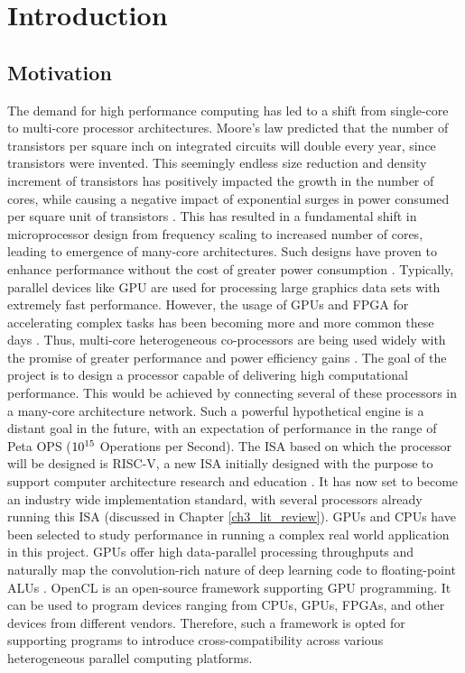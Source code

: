 \chapter{Introduction}
\label{ch1_introduction}
\section{Motivation}
\label{sect1_1}

The demand for high performance computing has led to a shift from single-core to multi-core processor architectures. Moore's law predicted that the number of transistors per square inch on integrated circuits will double every year, since transistors were invented. This seemingly endless size reduction and density increment of transistors has positively impacted the growth in the number of cores, while causing a negative impact of exponential surges in power consumed per square unit of transistors \cite{mimerschedval2015}. This has resulted in a fundamental shift in microprocessor design from frequency scaling to increased number of cores, leading to emergence of many-core architectures. Such designs have proven to enhance performance without the cost of greater power consumption \cite{intel2010}. \newline\newline
Typically, parallel devices like \ac{GPU} are used for processing large graphics data sets with extremely fast performance. However, the usage of GPUs and \ac{FPGA} for accelerating complex tasks has been becoming more and more common these days \cite{acm2004} \cite{vlsi2005}. Thus, multi-core heterogeneous co-processors are being used widely with the promise of greater performance and power efficiency gains \cite{acmsurvery2015}.\newline\newline
The goal of the project is to design a processor capable of delivering high computational performance. This would be achieved by connecting several of these processors in a many-core architecture network. Such a powerful hypothetical engine is a distant goal in the future, with an expectation of performance in the range of Peta OPS ($10\textsuperscript{15}$ Operations per Second). The \ac{ISA} based on which the processor will be designed is RISC-V, a new ISA initially designed with the purpose to support computer architecture research and education \cite{riscv_home}. It has now set to become an industry wide implementation standard, with several processors already running this ISA (discussed in Chapter \ref{ch3_lit_review}).\newline\newline
GPUs and CPUs have been selected to study performance in running a complex real world application in this project. GPUs offer high data-parallel processing throughputs and naturally map the convolution-rich nature of deep learning code to floating-point ALUs \cite{caffe2016}. OpenCL is an open-source framework supporting GPU programming. It can be used to program devices ranging from CPUs, GPUs, FPGAs, and other devices from different vendors. Therefore, such a framework is opted for supporting programs to introduce cross-compatibility across various heterogeneous parallel computing platforms.

